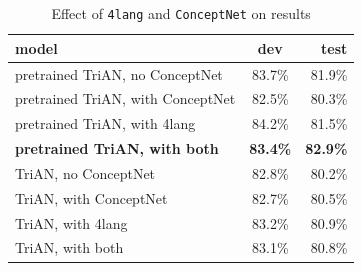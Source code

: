\begin{table}[h!]
	\centering
	\begin{tabular}{ | l | c | r | }
		\hline
		model & dev & test \\ \hline \hline
		pretrained TriAN, no ConceptNet & 83.7\% & 81.9\% \\ \hline
		pretrained TriAN, with ConceptNet & 82.5\% & 80.3\% \\ \hline
		pretrained TriAN, with 4lang & 84.2\% & 81.5\% \\ \hline
		\textbf{pretrained TriAN, with both} & \textbf{83.4\%} & \textbf{82.9\%} \\ \hline
		TriAN, no ConceptNet & 82.8\% & 80.2\% \\ \hline
		TriAN, with ConceptNet & 82.7\% & 80.5\% \\ \hline
		TriAN, with 4lang & 83.2\% & 80.9\% \\ \hline
		TriAN, with both & 83.1\% & 80.8\% \\ \hline
	\end{tabular}
	\caption{Effect of \texttt{4lang} and \texttt{ConceptNet} on results}
	\label{tabl:res}
\end{table}